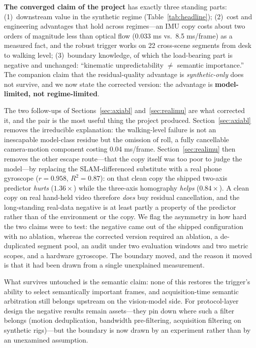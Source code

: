 \documentclass[12pt,a4paper]{article}
\begin{document}
\textbf{The converged claim of the project} has exactly three standing parts: (1)~downstream value in the synthetic regime (Table~\ref{tab:headline}); (2)~cost and engineering advantages that hold across regimes---an IMU copy costs about two orders of magnitude less than optical flow (0.033 ms vs.\ 8.5 ms/frame) as a measured fact, and the robust trigger works on 22 cross-scene segments from desk to walking level; (3)~boundary knowledge, of which the load-bearing part is negative and unchanged: ``kinematic unpredictability $\ne$ semantic importance.'' The companion claim that the residual-quality advantage is \emph{synthetic-only} does not survive, and we now state the corrected version: the advantage is \textbf{model-limited, not regime-limited}.

The two follow-ups of Sections~\ref{sec:axiabl} and~\ref{sec:realimu} are what corrected it, and the pair is the most useful thing the project produced. Section~\ref{sec:axiabl} removes the irreducible explanation: the walking-level failure is not an inescapable model-class residue but the omission of roll, a fully cancellable camera-motion component costing 0.04 ms/frame. Section~\ref{sec:realimu} then removes the other escape route---that the copy itself was too poor to judge the model---by replacing the SLAM-differenced substitute with a real phone gyroscope ($r{=}0.958$, $R^2{=}0.87$): on that clean copy the shipped two-axis predictor \emph{hurts} ($1.36\times$) while the three-axis homography \emph{helps} ($0.84\times$). A clean copy on real hand-held video therefore \emph{does} buy residual cancellation, and the long-standing real-data negative is at least partly a property of the predictor rather than of the environment or the copy. We flag the asymmetry in how hard the two claims were to test: the negative came out of the shipped configuration with no ablation, whereas the corrected version required an ablation, a de-duplicated segment pool, an audit under two evaluation windows and two metric scopes, and a hardware gyroscope. The boundary moved, and the reason it moved is that it had been drawn from a single unexplained measurement.

What survives untouched is the semantic claim: none of this restores the trigger's ability to select semantically important frames, and acquisition-time semantic arbitration still belongs upstream on the vision-model side. For protocol-layer design the negative results remain assets---they pin down where such a filter belongs (motion deduplication, bandwidth pre-filtering, acquisition filtering on synthetic rigs)---but the boundary is now drawn by an experiment rather than by an unexamined assumption.
\end{document}
